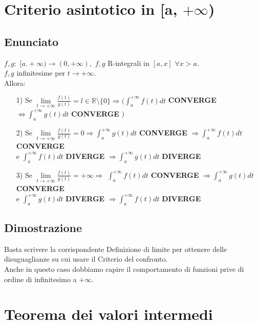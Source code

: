 \documentclass{article}
\newcommand{\R}{\mathbb{R}}
\newcommand{\vSpace}{\vspace{1em}}
\begin{document}
\begin{flushleft}
\section{Criterio asintotico in [a, $+\infty$)}
\subsection{Enunciato}
$f, g:$ $[a. +\infty) \rightarrow (0, +\infty),$ $f,g$ R-integrali in $[a,x]$ $\forall x > a$.\\
$f,g$ infinitesime per $t \to + \infty$.\\
Allora:
\begin{enumerate}
    \item[1)] Se $\lim\limits_{t \to +\infty}\frac{f(t)}{g(t)} = l \in \R \setminus \{0\} \Rightarrow (\int_{a}^{+\infty}f(t)dt$ \textbf{CONVERGE} $ \iff \int_{a}^{+\infty}g(t)dt$ \textbf{CONVERGE} $)$\\
    \item[2)] Se $\lim\limits_{t \to +\infty}\frac{f(t)}{g(t)} = 0 \Rightarrow $\hspace*{1em}$ \int_{a}^{+\infty}g(t)dt $ \textbf{CONVERGE} $ \Rightarrow \int_{a}^{+\infty}f(t)dt$ \textbf{CONVERGE}\\
    \hspace*{8.65em} e $\int_{a}^{+\infty}f(t)dt$ \textbf{DIVERGE} $ \Rightarrow \int_{a}^{+\infty}g(t)dt$ \textbf{DIVERGE}\\
    \item[3)] Se $\lim\limits_{t \to +\infty}\frac{f(t)}{g(t)} = + \infty \Rightarrow$ \hspace*{1em}$ \int_{a}^{+\infty}f(t)dt$ \textbf{CONVERGE} $\Rightarrow \int_{a}^{+\infty}g(t)dt$ \textbf{CONVERGE}\\
    \hspace*{10.26em} e $\int_{a}^{+\infty}g(t)dt$ \textbf{DIVERGE} $\Rightarrow \int_{a}^{+\infty}f(t)dt$ \textbf{DIVERGE}
\end{enumerate}

\subsection{Dimostrazione}
Basta scrivere la corrispondente Definizione di limite per ottenere delle disuguaglianze su cui usare il Criterio del confronto.\\
\vSpace
Anche in questo caso dobbiamo capire il comportamento di funzioni prive di ordine di infinitesimo a $+\infty$.

\section{Teorema dei valori intermedi}

\end{flushleft}
\end{document}
